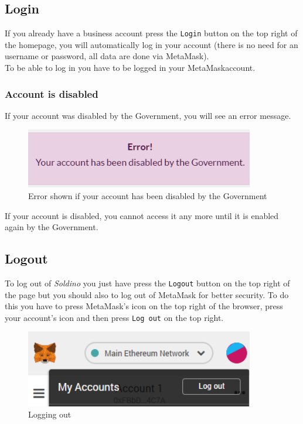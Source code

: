 	\subsection{Login}
	If you already have a business account press the \texttt{Login} button on the 
	top right of the homepage, you will automatically log in your account 
	(there is no need for an username or password, all data are done via MetaMask). 
	\\To be able to log in you have to be logged in your MetaMask\glosp account.
		\subsubsection{Account is disabled}
		If your account was disabled by the Government, you will see an error 
		message.
		\begin{figure}[H]
			\includegraphics[width=10cm]{res/images/user_disabled.png}
			\centering
			\caption{Error shown if your account has been disabled by the Government}
		\end{figure}
	\noindent If your account is disabled, you cannot access it any more until it 
	is enabled again by the Government.
	\subsection{Logout}
	To log out of \textit{Soldino} you just have press the \texttt{Logout} button on 
	the top right of the page but you should also to log out of MetaMask\glosp{} 
	for better security. To do this you have to press MetaMask's icon on the top 
	right of the browser, press your account's icon and then press \texttt{Log out}
	on the top right.
	\begin{figure}[H]
		\includegraphics[width=10cm]{res/images/logout_metamask.png}
		\centering
		\caption{Logging out}
	\end{figure}
